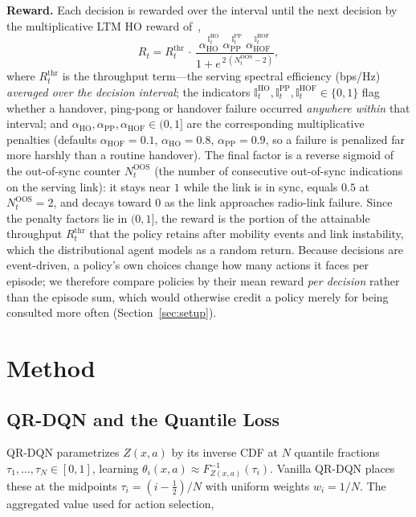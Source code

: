 \documentclass[conference]{IEEEtran}
\begin{document}
\textbf{Reward.} Each decision is rewarded over the interval until the next
decision by the multiplicative LTM HO reward of~\cite{cmab_ho},
\begin{equation}
R_t = R^{\mathrm{thr}}_t \,\cdot\,
      \frac{\alpha_{\mathrm{HO}}^{\,\mathbb{I}^{\mathrm{HO}}_t}\;
            \alpha_{\mathrm{PP}}^{\,\mathbb{I}^{\mathrm{PP}}_t}\;
            \alpha_{\mathrm{HOF}}^{\,\mathbb{I}^{\mathrm{HOF}}_t}}
           {1 + e^{\,2\,(N^{\mathrm{OOS}}_t - 2)}},
\label{eq:reward}
\end{equation}
where $R^{\mathrm{thr}}_t$ is the throughput term---the serving spectral
efficiency (bps/Hz) \emph{averaged over the decision interval}; the indicators
$\mathbb{I}^{\mathrm{HO}}_t,\mathbb{I}^{\mathrm{PP}}_t,\mathbb{I}^{\mathrm{HOF}}_t\in\{0,1\}$
flag whether a handover, ping-pong or handover failure occurred \emph{anywhere
within} that interval; and
$\alpha_{\mathrm{HO}},\alpha_{\mathrm{PP}},\alpha_{\mathrm{HOF}}\in(0,1]$ are the
corresponding multiplicative penalties (defaults $\alpha_{\mathrm{HOF}}{=}0.1$,
$\alpha_{\mathrm{HO}}{=}0.8$, $\alpha_{\mathrm{PP}}{=}0.9$, so a failure is
penalized far more harshly than a routine handover). The final factor is a
reverse sigmoid of the out-of-sync counter $N^{\mathrm{OOS}}_t$ (the number of
consecutive out-of-sync indications on the serving link): it stays near $1$
while the link is in sync, equals $0.5$ at $N^{\mathrm{OOS}}_t{=}2$, and decays
toward $0$ as the link approaches radio-link failure.
Since the penalty factors lie in $(0,1]$, the reward is the portion of the
attainable throughput $R^{\mathrm{thr}}_t$ that the policy retains after mobility
events and link instability, which the distributional agent models as a random
return.
Because decisions are event-driven, a policy's own choices change how many actions it
faces per episode; we therefore compare policies by their mean reward
\emph{per decision} rather than the episode sum, which would otherwise credit a
policy merely for being consulted more often (Section~\ref{sec:setup}).


\section{Method}
\label{sec:method}

\subsection{QR-DQN and the Quantile Loss}
QR-DQN parametrizes $Z(x,a)$ by its inverse CDF at $N$ quantile fractions
$\tau_1,\dots,\tau_N\in[0,1]$, learning
$\theta_i(x,a)\approx F^{-1}_{Z(x,a)}(\tau_i)$. Vanilla QR-DQN places these at
the midpoints $\tau_i=(i-\tfrac12)/N$ with uniform weights $w_i=1/N$. The
aggregated value used for action selection,
\end{document}
